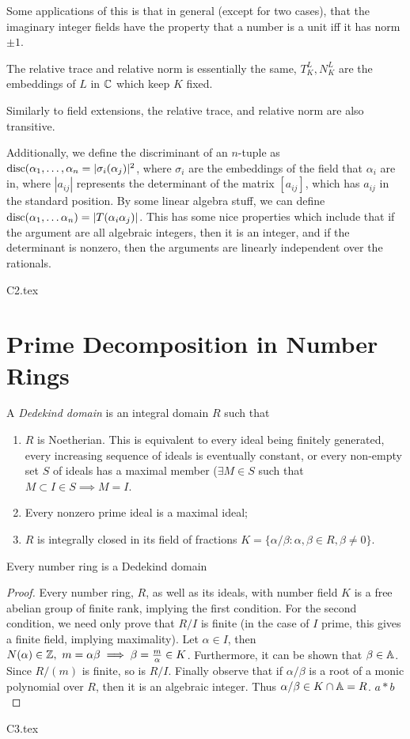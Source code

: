 \documentclass{article}
\begin{document}
Some applications of this is that in general (except for two cases), that the imaginary integer fields have the property that a number is a unit iff it has norm \(\pm1\).

\begin{definition}
The relative trace and relative norm is essentially the same, \(T^L_K, N^L_K\) are the embeddings of \(L\) in \(\CC\) which keep \(K\) fixed.
\end{definition}
Similarly to field extensions, the relative trace, and relative norm are also transitive.

Additionally, we define the discriminant of an \(n\)-tuple as \(\disc(\alpha_1, \dots, \alpha_n = |\sigma_i(\alpha_j)|^2\), where \(\sigma_i\) are the embeddings of the field that \(\alpha_i\) are in, where \(|a_{ij}|\) represents the determinant of the matrix \([a_{ij}]\), which has \(a_{ij}\) in the standard position. By some linear algebra stuff, we can define \(\disc(\alpha_1, \dots \alpha_n)=|T(\alpha_i\alpha_j)|\). 
This has some nice properties which include that if the argument are all algebraic integers, then it is an integer, and if the determinant is nonzero, then the arguments are linearly independent over the rationals.

{C2.tex}
\section{Prime Decomposition in Number Rings}
\begin{definition}
A \textit{Dedekind domain} is an integral domain \(R\) such that
\begin{enumerate}[label=(\alph*)]
    \item \(R\) is Noetherian. This is equivalent to every ideal being finitely generated, every increasing sequence of ideals is eventually constant, or every non-empty set \(S\) of ideals has a maximal member (\(\exists M \in S\) such that \(M \subset I \in S \implies M=I\).
    \item Every nonzero prime ideal is a maximal ideal;
    \item \(R\) is integrally closed in its field of fractions \(K = \{ \alpha/\beta : \alpha, \beta \in R, \beta \neq 0 \}\).
\end{enumerate}
\end{definition}
\begin{theorem}
Every number ring is a Dedekind domain
\end{theorem}
\begin{proof}
Every number ring, \(R\), as well as its ideals, with number field \(K\) is a free abelian group of finite rank, implying the first condition. For the second condition, we need only prove that \(R/I\) is finite (in the case of \(I\) prime, this gives a finite field, implying maximality). Let \(\alpha \in I\), then \(N(\alpha) \in \ZZ, \ m=\alpha\beta \implies \beta = \frac{m}{\alpha} \in K\). Furthermore, it can be shown that \(\beta \in \AA\). Since \(R/(m)\) is finite, so is \(R/I\). Finally observe that if \(\alpha/\beta\) is a root of a monic polynomial over \(R\), then it is an algebraic integer. Thus \(\alpha/\beta \in K \cap \AA = R\). \( a \ast b\) 

\end{proof}
{C3.tex}
\end{document}
